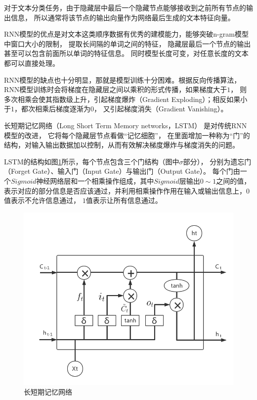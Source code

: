 对于文本分类任务，由于隐藏层中最后一个隐藏节点能够接收到之前所有节点的输出信息，
所以通常将该节点的输出向量作为网络最后生成的文本特征向量。

RNN模型的优点是对文本这类顺序数据有优秀的建模能力，能够突破n-gram模型中窗口大小的限制，
提取长间隔的单词之间的特征，
隐藏层最后一个节点的输出甚至可以包含前面所以单词的特征信息。
同时模型长度可变，对任意长度的文本都可以直接处理。

RNN模型的缺点也十分明显，那就是模型训练十分困难。根据反向传播算法，
RNN模型训练时会将梯度在隐藏层之间以乘积的形式传播，如果梯度大于$1$，
则多次相乘会使其指数级上升，引起梯度爆炸（Gradient Exploding）；相反如果小于$1$，都次相乘后梯度逐渐为$0$，
又引起梯度消失（Gradient Vanishing）。

长短期记忆网络（Long Short Term Memory networks，LSTM）
是对传统RNN模型的改进，
它将每个隐藏层节点看做“记忆细胞”，
在里面增加一种称为“门”的结构，对输入输出数据加以控制，从而有效解决梯度爆炸与梯度消失的问题。

LSTM的结构如图\ref{LSTM}所示，每个节点包含三个门结构（图中$\sigma $部分），
分别为遗忘门（Forget Gate）、输入门（Input Gate）与输出门（Output Gate）。
每个门由一个$Sigmoid$神经网络层和一个相乘操作组成，其中$Sigmoid$层输出$0\sim1$之间的值，
表示对应的部分信息是否应该通过，并利用相乘操作作用在输入或输出信息上，$0$值表示不允许信息通过，
$1$值表示让所有信息通过。
\begin{figure}[h]
    \includegraphics[scale=0.5]{picture/LSTM.png}
    \caption{长短期记忆网络}
    \label{LSTM}
\end{figure}

